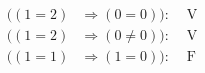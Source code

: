 \begin{align*}
  ( (1 = 2) &\Rightarrow (0 = 0) ) : &\text{ V}\\ 
  ( (1 = 2) &\Rightarrow (0 \neq 0) ): &\text{ V} \\
  ( (1 = 1) &\Rightarrow (1 = 0) ): &\text{ F}
\end{align*}